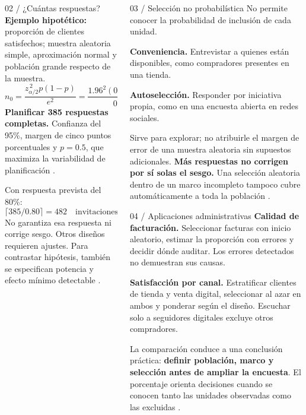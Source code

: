 \documentclass[spanish,final,xcolor={dvipsnames,table}]{beamer}
\newlength{\itescapanelwidth}
\begin{document}
\begin{itescaposter}
\begin{columns}[t,totalwidth=\colwidth]
\begin{column}{\itescapanelwidth}
\begin{itescaposterpanel}{02 / ¿Cuántas respuestas?}
\textbf{Ejemplo hipotético:} proporción de clientes satisfechos; muestra aleatoria simple, aproximación normal y población grande respecto de la muestra.
\[
 n_0=\frac{z_{\alpha/2}^{\,2}p(1-p)}{e^2}
 =\frac{1.96^2(0.5)(0.5)}{0.05^2}=384.16
\]
\textbf{Planificar 385 respuestas completas.} Confianza del 95\%, margen de cinco puntos porcentuales y $p=0.5$, que maximiza la variabilidad de planificación \citep{holmesBusiness2023}.

Con respuesta prevista del 80\%:
\[
 \lceil385/0.80\rceil=482\quad\text{invitaciones}.
\]
No garantiza esa respuesta ni corrige sesgo. Otros diseños requieren ajustes. Para contrastar hipótesis, también se especifican potencia y efecto mínimo detectable \citep{nistHandbook}.
\end{itescaposterpanel}
\end{column}
\begin{column}{\itescapanelwidth}
\begin{itescaposterpanel}{03 / Selección no probabilística}
No permite conocer la probabilidad de inclusión de cada unidad.

\textbf{Conveniencia.} Entrevistar a quienes están disponibles, como compradores presentes en una tienda.

\textbf{Autoselección.} Responder por iniciativa propia, como en una encuesta abierta en redes sociales.

Sirve para explorar; no atribuirle el margen de error de una muestra aleatoria sin supuestos adicionales. \textbf{Más respuestas no corrigen por sí solas el sesgo.} Una selección aleatoria dentro de un marco incompleto tampoco cubre automáticamente a toda la población \citep{bradley2021}.
\end{itescaposterpanel}

\begin{itescaposterpanel}{04 / Aplicaciones administrativas}
\textbf{Calidad de facturación.} Seleccionar facturas con inicio aleatorio, estimar la proporción con errores y decidir dónde auditar. Los errores detectados no demuestran sus causas.

\textbf{Satisfacción por canal.} Estratificar clientes de tienda y venta digital, seleccionar al azar en ambos y ponderar según el diseño. Escuchar solo a seguidores digitales excluye otros compradores.

La comparación conduce a una conclusión práctica: \textbf{definir población, marco y selección antes de ampliar la encuesta}. El porcentaje orienta decisiones cuando se conocen tanto las unidades observadas como las excluidas \citep{bradley2021,holmesBusiness2023}.
\end{itescaposterpanel}
\end{column}
\end{columns}


\end{itescaposter}
\end{document}
